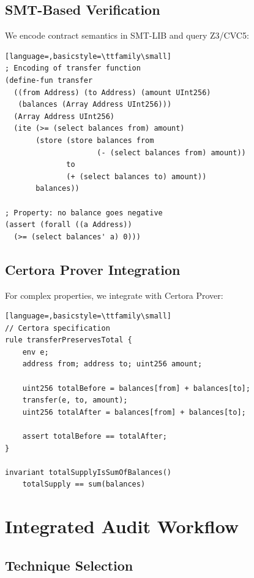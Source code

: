 \documentclass[11pt,a4paper]{article}
\theoremstyle{definition}
\begin{document}
\subsection{SMT-Based Verification}

We encode contract semantics in SMT-LIB and query Z3/CVC5:

\begin{lstlisting}[language=,basicstyle=\ttfamily\small]
; Encoding of transfer function
(define-fun transfer
  ((from Address) (to Address) (amount UInt256)
   (balances (Array Address UInt256)))
  (Array Address UInt256)
  (ite (>= (select balances from) amount)
       (store (store balances from
                     (- (select balances from) amount))
              to
              (+ (select balances to) amount))
       balances))

; Property: no balance goes negative
(assert (forall ((a Address))
  (>= (select balances' a) 0)))
\end{lstlisting}

\subsection{Certora Prover Integration}

For complex properties, we integrate with Certora Prover:

\begin{lstlisting}[language=,basicstyle=\ttfamily\small]
// Certora specification
rule transferPreservesTotal {
    env e;
    address from; address to; uint256 amount;

    uint256 totalBefore = balances[from] + balances[to];
    transfer(e, to, amount);
    uint256 totalAfter = balances[from] + balances[to];

    assert totalBefore == totalAfter;
}

invariant totalSupplyIsSumOfBalances()
    totalSupply == sum(balances)
\end{lstlisting}

\section{Integrated Audit Workflow}

\subsection{Technique Selection}
\end{document}
